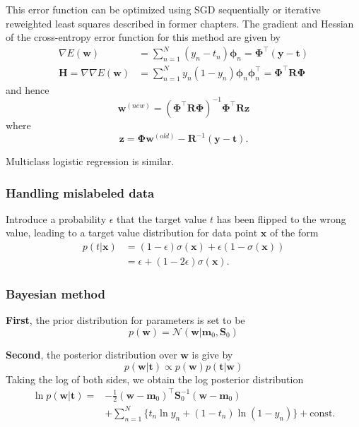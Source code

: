 \documentclass[a4paper]{book}
\newcommand{\up}{\mathrm}
\renewcommand{\bf}{\mathbf}
\renewcommand{\cal}{\mathcal}
\newcommand{\bs}{\boldsymbol}
\begin{document}
This error function can be optimized using SGD sequentially or iterative reweighted least squares described in former chapters. The gradient and Hessian of the cross-entropy error function for this method are given by
\begin{align}
	\nabla E(\bf{w}) &= \sum_{n=1}^N (y_n -t_n) \bs{\phi}_n = \bs{\Phi}^{\intercal} (\bf{y-t})\\
	\bf{H} = \nabla\nabla E(\bf{w}) &= \sum_{n=1} ^N  y_n(1-y_n)\bs{\phi}_n\bs{\phi}_n^{\intercal} = \bs{\Phi}^{\intercal}\bf{R} \bs{\Phi}
\end{align}
and hence
\begin{equation}
	\bf{w}^{(new)} = (\bs{\Phi}^{\intercal} \bf{R} \bs{\Phi})^{-1} \bs{\Phi}^{\intercal} \bf{Rz}	
\end{equation}
where
\begin{equation}
	\bf{z} = \bs{\Phi} \bf{w}^{(old)} - \bf{R}^{-1}(\bf{y-t}).
\end{equation}

Multiclass logistic regression is similar.

\subsubsection{Handling mislabeled data}
Introduce a probability $\epsilon$ that the target value $t$ has been flipped to the wrong value, leading to a target value distribution for data point $\bf{x}$ of the form
\begin{align}
	p(t|\bf{x}) &= (1-\epsilon) \sigma(\bf{x}) + \epsilon(1-\sigma(\bf{x})) \\
	&= \epsilon + (1-2\epsilon) \sigma(\bf{x}).
\end{align}
\subsubsection{Bayesian method}
\textbf{First}, the prior distribution for parameters is set to be
\begin{equation}
	p(\bf{w}) = \cal{N}(\bf{w}|\bf{m}_0,\bf{S}_0)
\end{equation}

\textbf{Second}, the posterior distribution over $\bf{w}$ is give by
\begin{equation}
	p(\bf{w|t}) \propto p(\bf{w}) p(\bf{t|w})
\end{equation}
Taking the log of both sides, we obtain the log posterior distribution
\begin{align}
	\ln p(\bf{w|t}) = &-\frac{1}{2} (\bf{w-m}_0)^{\intercal} \bf{S}_0^{-1} (\bf{w-m}_0) \\
	&+ \sum_{n=1}^N \{ t_n \ln y_n + (1-t_n)\ln (1-y_n) \} + \up{const.}
\end{align}
\end{document}
